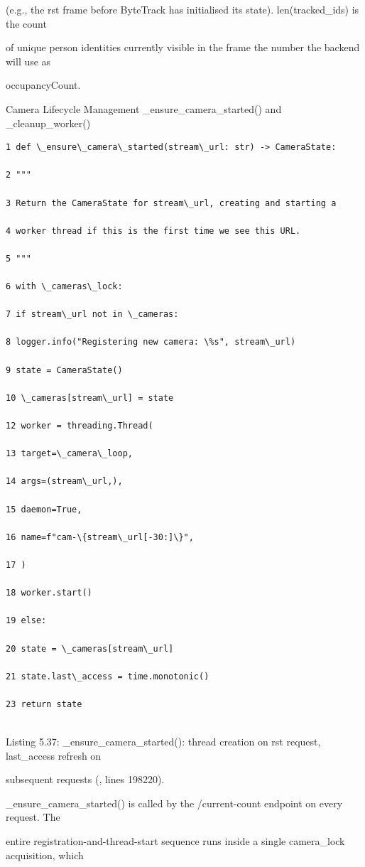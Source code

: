 (e.g., the rst frame before ByteTrack has initialised its state). len(tracked\_ids) is the count

of unique person identities currently visible in the frame  the number the backend will use as

occupancyCount.

Camera Lifecycle Management  \_ensure\_camera\_started() and \_cleanup\_worker()

\begin{listingbox}
	\begin{verbatim}
1 def \_ensure\_camera\_started(stream\_url: str) -> CameraState:

2 """

3 Return the CameraState for stream\_url, creating and starting a

4 worker thread if this is the first time we see this URL.

5 """

6 with \_cameras\_lock:

7 if stream\_url not in \_cameras:

8 logger.info("Registering new camera: \%s", stream\_url)

9 state = CameraState()

10 \_cameras[stream\_url] = state

12 worker = threading.Thread(

13 target=\_camera\_loop,

14 args=(stream\_url,),

15 daemon=True,

16 name=f"cam-\{stream\_url[-30:]\}",

17 )

18 worker.start()

19 else:

20 state = \_cameras[stream\_url]

21 state.last\_access = time.monotonic()

23 return state


\end{verbatim}
\end{listingbox}
Listing 5.37: \_ensure\_camera\_started(): thread creation on rst request, last\_access refresh on

subsequent requests (, lines 198220).

\_ensure\_camera\_started() is called by the /current-count endpoint on every request. The

entire registration-and-thread-start sequence runs inside a single camera\_lock acquisition, which

